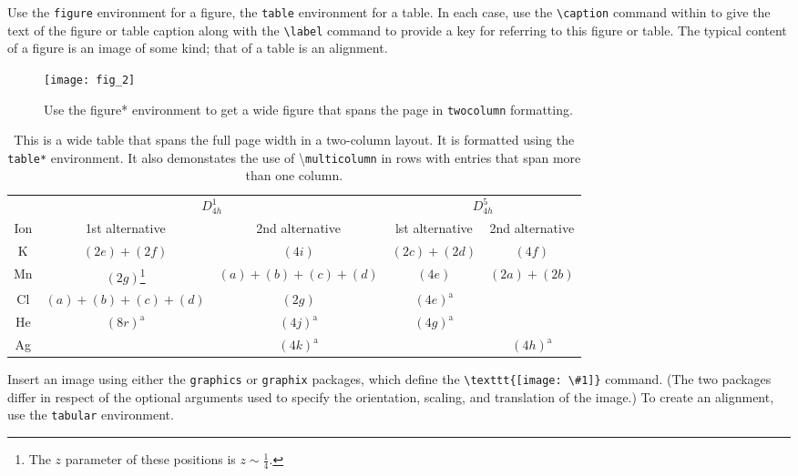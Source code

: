 \documentclass[%
 reprint,
 amsmath,amssymb,
 aps,
]{revtex4-2}
\begin{document}
  Use the \texttt{figure} environment for a figure, the \texttt{table} environment for a table.
  In each case, use the \verb+\caption+ command within to give the text of the
  figure or table caption along with the \verb+\label+ command to provide
  a key for referring to this figure or table.
  The typical content of a figure is an image of some kind; 
  that of a table is an alignment.%
  \begin{figure*}
    \texttt{[image: fig\_2]}%
    \caption{\label{fig:wide}Use the figure* environment to get a wide
    figure that spans the page in \texttt{twocolumn} formatting.}
  \end{figure*}
  \begin{table*}
    \caption{\label{tab:table3}This is a wide table that spans the full page
      width in a two-column layout. It is formatted using the
      \texttt{table*} environment. It also demonstates the use of
      \textbackslash\texttt{multicolumn} in rows with entries that span
    more than one column.}
    \begin{ruledtabular}
      \begin{tabular}{ccccc}
 &\multicolumn{2}{c}{$D_{4h}^1$}&\multicolumn{2}{c}{$D_{4h}^5$}\\
        Ion&1st alternative&2nd alternative&lst alternative
           &2nd alternative\\ \hline
        K&$(2e)+(2f)$&$(4i)$ &$(2c)+(2d)$&$(4f)$ \\
        Mn&$(2g)$\footnote{The $z$ parameter of these positions is $z\sim\frac{1}{4}$.}
          &$(a)+(b)+(c)+(d)$&$(4e)$&$(2a)+(2b)$\\
        Cl&$(a)+(b)+(c)+(d)$&$(2g)$\footnotemark[1]
          &$(4e)^{\text{a}}$\\
        He&$(8r)^{\text{a}}$&$(4j)^{\text{a}}$&$(4g)^{\text{a}}$\\
        Ag& &$(4k)^{\text{a}}$& &$(4h)^{\text{a}}$\\
      \end{tabular}
    \end{ruledtabular}
  \end{table*}

  Insert an image using either the \texttt{graphics} or
  \texttt{graphix} packages, which define the \verb+\texttt{[image: \#1]}+ command.
  (The two packages differ in respect of the optional arguments 
  used to specify the orientation, scaling, and translation of the image.) 
  To create an alignment, use the \texttt{tabular} environment. 
\end{document}
